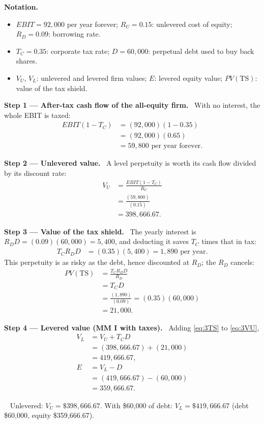 \documentclass[11pt,a4paper]{article}
\numberwithin{equation}{section}
\newcommand{\notation}{\par\smallskip\noindent\textbf{Notation.}}
\newcommand{\step}[2]{\par\smallskip\noindent\textbf{Step #1 --- #2.}~}
\newcommand{\answer}[1]{\par\smallskip\noindent\fbox{\textbf{Answer #1.}}~}
\begin{document}
\notation
\begin{itemize}
  \item $\mathit{EBIT}=92{,}000$ per year forever; $R_U=0.15$: unlevered cost of equity; $R_D=0.09$: borrowing rate.
  \item $T_C=0.35$: corporate tax rate; $D=60{,}000$: perpetual debt used to buy back shares.
  \item $V_U$, $V_L$: unlevered and levered firm values; $E$: levered equity value; $\mathit{PV}(\text{TS})$: value of the tax shield.
\end{itemize}

\step{1}{After-tax cash flow of the all-equity firm} With no interest, the whole EBIT is taxed:
\begin{align}
  \mathit{EBIT}(1-T_C) &= (92{,}000)(1-0.35) \nonumber\\
     &= (92{,}000)(0.65) \nonumber\\
     &= 59{,}800 \text{ per year forever}. \nonumber
\end{align}

\step{2}{Unlevered value} A level perpetuity is worth its cash flow divided by its discount rate:
\begin{align}
  V_U &= \frac{\mathit{EBIT}(1-T_C)}{R_U} \label{eq:3VU}\\
      &= \frac{(59{,}800)}{(0.15)} \nonumber\\
      &= 398{,}666.67. \nonumber
\end{align}

\step{3}{Value of the tax shield} The yearly interest is $R_D D=(0.09)(60{,}000)=5{,}400$, and
deducting it saves $T_C$ times that in tax:
\begin{align}
  T_C R_D D &= (0.35)(5{,}400) = 1{,}890 \text{ per year}. \nonumber
\end{align}
This perpetuity is as risky as the debt, hence discounted at $R_D$; the $R_D$ cancels:
\begin{align}
  \mathit{PV}(\text{TS}) &= \frac{T_C R_D D}{R_D} \label{eq:3TS}\\
      &= T_C D \nonumber\\
      &= \frac{(1{,}890)}{(0.09)} = (0.35)(60{,}000) \nonumber\\
      &= 21{,}000. \nonumber
\end{align}

\step{4}{Levered value (MM I with taxes)} Adding \eqref{eq:3TS} to \eqref{eq:3VU},
\begin{align}
  V_L &= V_U + T_C D \label{eq:3VL}\\
      &= (398{,}666.67)+(21{,}000) \nonumber\\
      &= 419{,}666.67, \nonumber\\
  E   &= V_L - D \nonumber\\
      &= (419{,}666.67)-(60{,}000) \nonumber\\
      &= 359{,}666.67. \nonumber
\end{align}
\answer{(firm values)} Unlevered: $V_U=\$398{,}666.67$. With \$60{,}000 of debt: $V_L=\$419{,}666.67$
(debt \$60{,}000, equity \$359{,}666.67).
\end{document}
